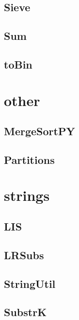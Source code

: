 \subsection{ Sieve}
\raggedbottom
\hrulefill
\subsection{ Sum}
\raggedbottom
\hrulefill
\subsection{ toBin}
\raggedbottom
\hrulefill

\section{other}
\subsection{ MergeSortPY}
\raggedbottom
\hrulefill
\subsection{ Partitions}
\raggedbottom
\hrulefill

\section{strings}
\subsection{ LIS}
\raggedbottom
\hrulefill
\subsection{ LRSubs}
\raggedbottom
\hrulefill
\subsection{ StringUtil}
\raggedbottom
\hrulefill
\subsection{ SubstrK}
\raggedbottom
\hrulefill


